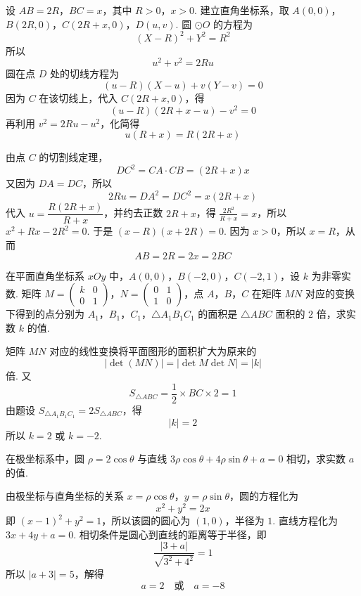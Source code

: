 \begin{solution}
设 \(AB=2R\)，\(BC=x\)，其中 \(R>0\)，\(x>0\). 建立直角坐标系，取
\(A(0,0)\)，\(B(2R,0)\)，\(C(2R+x,0)\)，\(D(u,v)\).
圆 \(\odot O\) 的方程为
\[
(X-R)^2+Y^2=R^2
\]
所以
\[
u^2+v^2=2Ru
\]
圆在点 \(D\) 处的切线方程为
\[
(u-R)(X-u)+v(Y-v)=0
\]
因为 \(C\) 在该切线上，代入 \(C(2R+x,0)\)，得
\[
(u-R)(2R+x-u)-v^2=0
\]
再利用 \(v^2=2Ru-u^2\)，化简得
\[
u(R+x)=R(2R+x)
\]

由点 \(C\) 的切割线定理，
\[
DC^2=CA\cdot CB=(2R+x)x
\]
又因为 \(DA=DC\)，所以
\[
2Ru=DA^2=DC^2=x(2R+x)
\]
代入 \(u=\dfrac{R(2R+x)}{R+x}\)，并约去正数 \(2R+x\)，得
\(\frac{2R^2}{R+x}=x\)，所以 \(x^2+Rx-2R^2=0\).
于是 \((x-R)(x+2R)=0\). 因为 \(x>0\)，所以 \(x=R\)，从而
\[
AB=2R=2x=2BC
\]
\end{solution}

\reuseproblemnumber
\begin{problem}[B]
在平面直角坐标系 \(xOy\) 中，\(A(0,0)\)，\(B(-2,0)\)，\(C(-2,1)\)，设 \(k\) 为非零实数. 矩阵 \(M=\begin{pmatrix}k&0\\0&1\end{pmatrix}\)，\(N=\begin{pmatrix}0&1\\1&0\end{pmatrix}\)，点 \(A\)，\(B\)，\(C\) 在矩阵 \(MN\) 对应的变换下得到的点分别为 \(A_1\)，\(B_1\)，\(C_1\)，\(\triangle A_1B_1C_1\) 的面积是 \(\triangle ABC\) 面积的 \(2\) 倍，求实数 \(k\) 的值.
\end{problem}

\begin{solution}
矩阵 \(MN\) 对应的线性变换将平面图形的面积扩大为原来的
\[
\left|\det(MN)\right|=\left|\det M\det N\right|=|k|
\]
倍. 又
\[
S_{\triangle ABC}=\frac12\times BC\times2=1
\]
由题设 \(S_{\triangle A_1B_1C_1}=2S_{\triangle ABC}\)，得
\[
|k|=2
\]
所以 \(k=2\) 或 \(k=-2\).
\end{solution}

\reuseproblemnumber
\begin{problem}[C]
在极坐标系中，圆 \(\rho=2\cos\theta\) 与直线 \(3\rho\cos\theta+4\rho\sin\theta+a=0\) 相切，求实数 \(a\) 的值.
\end{problem}

\begin{solution}
由极坐标与直角坐标的关系 \(x=\rho\cos\theta\)，\(y=\rho\sin\theta\)，圆的方程化为
\[
x^2+y^2=2x
\]
即 \((x-1)^2+y^2=1\)，所以该圆的圆心为 \((1,0)\)，半径为 \(1\). 直线方程化为 \(3x+4y+a=0\).
相切条件是圆心到直线的距离等于半径，即
\[
\frac{|3+a|}{\sqrt{3^2+4^2}}=1
\]
所以 \(|a+3|=5\)，解得
\[
a=2\quad\text{或}\quad a=-8
\]
\end{solution}

